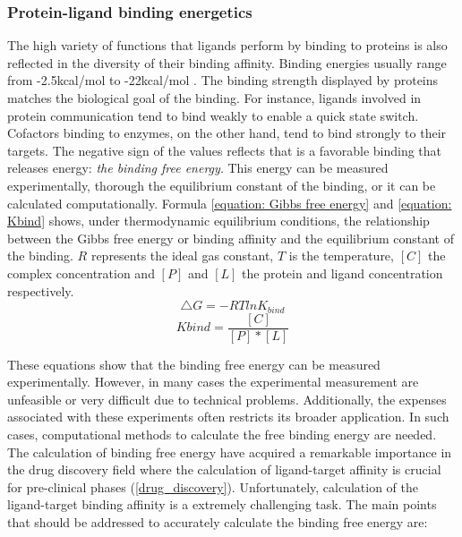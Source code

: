 \documentclass[11pt, b5paper,twoside]{tesi_upf}
\begin{document}
\subsubsection{Protein-ligand binding energetics}\label{binding_energetics}

\par The high variety of functions that ligands perform by binding to proteins is also reflected in the diversity of their binding affinity. Binding energies usually range from -2.5kcal/mol to -22kcal/mol \cite{Dunn2001}. The binding strength displayed by proteins matches the biological goal of the binding. For instance, ligands involved in protein communication tend to bind weakly to enable a quick state switch. Cofactors binding to enzymes, on the other hand,  tend to bind strongly to their targets.  The negative sign of the values reflects that is a favorable binding that releases energy: \textit{the binding free energy}.  This energy can be measured experimentally, thorough the equilibrium constant of the binding, or it can be calculated computationally. Formula \ref{equation: Gibbs free energy} and \ref{equation: Kbind} shows, under thermodynamic equilibrium conditions, the relationship between the Gibbs free energy or binding affinity and the equilibrium constant of the binding. $R$ represents the ideal gas constant, $T$ is the temperature, $[C]$ the complex concentration and $[P]$ and $[L]$ the protein and ligand concentration respectively. 
\begin{equation}\label{equation: Gibbs free energy}
\bigtriangleup G=-RTlnK_{bind} 
\end{equation}
\begin{equation}\label{equation: Kbind}
Kbind = \frac{[C]}{[P]*[L]}
\end{equation}
\par These equations show that the binding free energy can be measured experimentally. However, in many cases the experimental measurement are unfeasible or very difficult due to technical problems. Additionally, the expenses associated with these experiments often restricts its broader application. In such cases, computational methods to calculate the free binding energy are needed. The calculation of binding free energy have acquired a remarkable importance in the drug discovery field where the calculation of ligand-target affinity is crucial for pre-clinical phases (\cref{drug_discovery}). Unfortunately, calculation of the ligand-target binding affinity is a extremely challenging task. The main points that should be addressed to accurately calculate the binding free energy are: 
\end{document}
